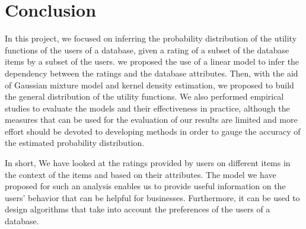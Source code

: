\section{Conclusion}
	In this project, we focused on inferring the probability distribution of the utility functions of the users of a database, given a rating of a subset of the database items by a subset of the users. we proposed the use of a linear model to infer the dependency between the ratings and the database attributes. Then, with the aid of Gaussian mixture model and kernel density estimation, we proposed to build the general distribution of the utility functions. We also performed empirical studies to evaluate the models and their effectiveness in practice, although the measures that can be used for the evaluation of our results are limited and more effort should be devoted to developing methods in order to gauge the accuracy of the estimated probability distribution.
	
	In short, We have looked at the ratings provided by users on different items in the context of the items and based on their attributes. The model we have proposed for such an analysis enables us to provide useful information on the users' behavior that can be helpful for businesses. Furthermore, it can be used to design algorithms that take into account the preferences of the users of a database. 
	
